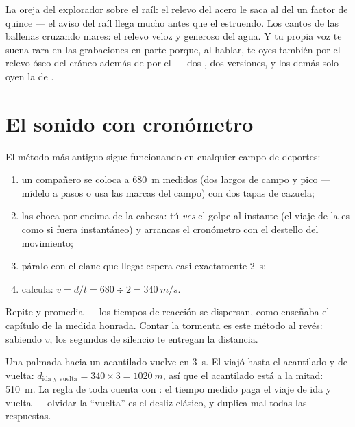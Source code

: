 \begin{example}\label{ex:g7:sound-production:scenes}
La oreja del explorador sobre el raíl: el relevo del acero le saca al
del  un factor de quince --- el aviso del raíl llega mucho antes
que el estruendo. Los cantos de las ballenas cruzando mares: el relevo
veloz y generoso del agua. Y tu propia voz te suena rara en las
grabaciones en parte porque, al hablar, te oyes también por el relevo
óseo del cráneo además de por el  --- dos , dos versiones,
y los demás solo oyen la de .
\end{example}

\section{El sonido con cronómetro}

\begin{method}\label{met:g7:sound-production:measure}
El método más antiguo sigue funcionando en cualquier campo de
deportes:
\begin{enumerate}
  \item un compañero se coloca a \qty{680}{m} medidos (dos largos de
        campo y pico --- mídelo a pasos o usa las marcas del campo)
        con dos tapas de cazuela;
  \item las choca por encima de la cabeza: tú \emph{ves} el golpe al
        instante (el viaje de la  es como si fuera
        instantáneo) y arrancas el cronómetro con el destello del
        movimiento;
  \item páralo con el clanc que llega: espera casi exactamente
        \qty{2}{s};
  \item calcula: $v = d/t = 680 \div 2 = \qty{340}{m/s}$.
\end{enumerate}
Repite y promedia --- los tiempos de reacción se dispersan, como
enseñaba el capítulo de la medida honrada. Contar la tormenta es este
método al revés: sabiendo $v$, los segundos de silencio te entregan la
distancia.
\end{method}

\begin{example}\label{ex:g7:sound-production:echo}
Una palmada hacia un acantilado vuelve en \qty{3}{s}. El
 viajó hasta el acantilado y de vuelta: $d_{\text{ida y
vuelta}} = 340 \times 3 = \qty{1020}{m}$, así que el acantilado está a
la mitad: \qty{510}{m}. La regla de toda cuenta con : el tiempo
medido paga el viaje de ida y vuelta --- olvidar la ``vuelta'' es el
desliz clásico, y duplica mal todas las respuestas.
\end{example}

